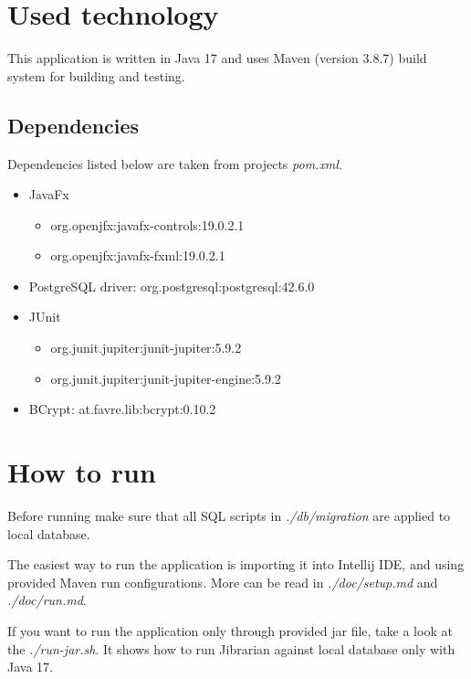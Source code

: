 \documentclass[11pt,twoside,a4paper]{article}
\begin{document}
\section{Used technology}

This application is written in Java 17 and uses Maven (version 3.8.7) build
system for building and testing.

\subsection*{Dependencies}

Dependencies listed below are taken from projects \emph{pom.xml}.

\begin{itemize}
    \item JavaFx
          \begin{itemize}
              \item org.openjfx:javafx-controls:19.0.2.1
              \item org.openjfx:javafx-fxml:19.0.2.1
          \end{itemize}
    \item PostgreSQL driver: org.postgresql:postgresql:42.6.0
    \item JUnit
          \begin{itemize}
              \item org.junit.jupiter:junit-jupiter:5.9.2
              \item org.junit.jupiter:junit-jupiter-engine:5.9.2
          \end{itemize}
    \item BCrypt: at.favre.lib:bcrypt:0.10.2
\end{itemize}

\section{How to run}

Before running make sure that all SQL scripts in \emph{./db/migration} are applied
to local database.

The easiest way to run the application is importing it into Intellij IDE, and
using provided Maven run configurations. More can be read in \emph{./doc/setup.md}
and \emph{./doc/run.md}.

If you want to run the application only through provided jar file, take a look
at the \emph{./run-jar.sh}. It shows how to run Jibrarian against local database
only with Java 17.
\end{document}
